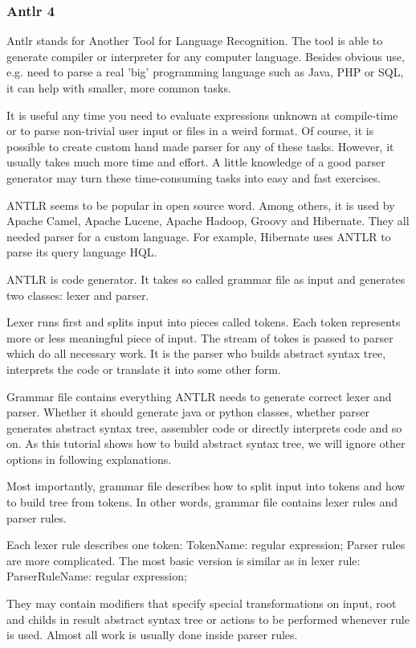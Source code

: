 \subsubsection{Antlr 4}
Antlr stands for Another Tool for Language Recognition. The tool is able to generate compiler or interpreter for any computer language. Besides obvious use, e.g. need to parse a real 'big' programming language such as Java, PHP or SQL, it can help with smaller, more common tasks.

It is useful any time you need to evaluate expressions unknown at compile-time or to parse non-trivial user input or files in a weird format. Of course, it is possible to create custom hand made parser for any of these tasks. However, it usually takes much more time and effort. A little knowledge of a good parser generator may turn these time-consuming tasks into easy and fast exercises.

ANTLR seems to be popular in open source word. Among others, it is used by Apache Camel, Apache Lucene, Apache Hadoop, Groovy and Hibernate. They all needed parser for a custom language. For example, Hibernate uses ANTLR to parse its query language HQL.

ANTLR is code generator. It takes so called grammar file as input and generates two classes: lexer and parser.

Lexer runs first and splits input into pieces called tokens. Each token represents more or less meaningful piece of input. The stream of tokes is passed to parser which do all necessary work. It is the parser who builds abstract syntax tree, interprets the code or translate it into some other form.

Grammar file contains everything ANTLR needs to generate correct lexer and parser. Whether it should generate java or python classes, whether parser generates abstract syntax tree, assembler code or directly interprets code and so on. As this tutorial shows how to build abstract syntax tree, we will ignore other options in following explanations.

Most importantly, grammar file describes how to split input into tokens and how to build tree from tokens. In other words, grammar file contains lexer rules and parser rules.

Each lexer rule describes one token: TokenName: regular expression; Parser rules are more complicated. The most basic version is similar as in lexer rule: ParserRuleName: regular expression;  

They may contain modifiers that specify special transformations on input, root and childs in result abstract syntax tree or actions to be performed whenever rule is used. Almost all work is usually done inside parser rules.